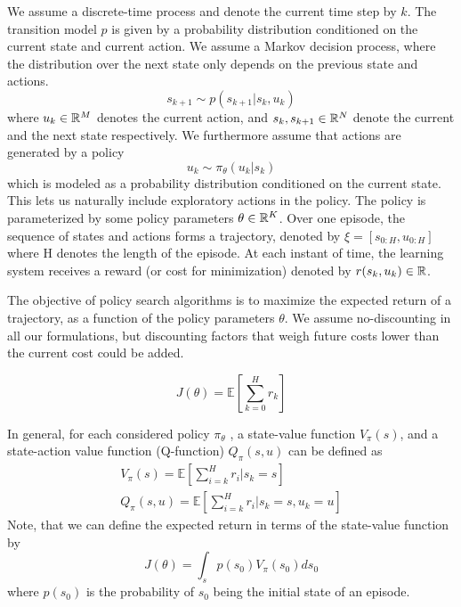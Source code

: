 We assume a discrete-time process and denote the
current time step by $k$. The transition model $p$ is given by a probability distribution conditioned on the current state and current action. We assume a Markov decision process, where the distribution over the next state only depends on the previous state and actions.
\begin{equation}
    s_{k+1} \sim p(s_{k+1}|s_k,u_k)
\end{equation}
where $u_k \in \mathbb R^M$ denotes the current action, and $s_k, s_{k+1} \in \mathbb R^N$
denote the current and the next state respectively. We furthermore
assume that actions are generated by a policy
\begin{equation}
    u_k \sim \pi_{\theta}(u_k|s_k)
\end{equation}
which is modeled as a probability distribution conditioned on the current state. This lets us naturally include exploratory actions in the policy. The policy is parameterized by some policy parameters $\theta \in \mathbb R^K$. Over one episode, the sequence of states and actions forms a trajectory, denoted by $\xi = [s_{0:H}, u_{0:H}]$ where H
denotes the length of the episode. At each instant of time,
the learning system receives a reward (or cost for minimization) denoted by $r(s_k, u_k) \in \mathbb R$.

The objective of policy search algorithms is to maximize the expected return of a trajectory, as a function of the policy parameters $\theta$. We assume no-discounting in all our formulations, but discounting factors that weigh future costs lower than the current cost could be added.

\begin{equation}
    J(\theta) = \mathds{E}[\sum_{k=0}^H r_k]
\end{equation}

In general, for each considered policy $\pi_{\theta}$ , a
state-value function $V_\pi(s)$, and a state-action value function (Q-function) $Q_\pi(s,u)$ can be defined as
\begin{align}
    V_\pi(s) = \mathds{E}[\sum_{i=k}^H r_i | s_k = s] \\
    Q_\pi(s, u) = \mathds{E}[\sum_{i=k}^H r_i | s_k = s, u_k = u]
\end{align}
Note, that we can define the expected return in terms of the state-value
function by
\begin{equation}
    J(\theta) = \int_s p(s_0)V_\pi(s_0) ds_0
\end{equation}
where $p(s_0)$ is the probability of $s_0$ being the initial state of an episode.

